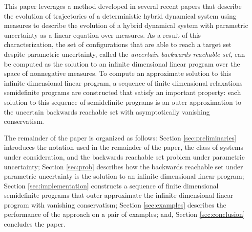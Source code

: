This paper leverages a method developed in several recent papers \cite{henrion2014convex,majumdar2014convex,shia2014convex} that describe the evolution of trajectories of a deterministic hybrid dynamical system using measures to describe the evolution of a hybrid dynamical system with parametric uncertainty as a linear equation over measures. 
As a result of this characterization, the set of configurations that are able to reach a target set despite parametric uncertainty, called the \emph{uncertain backwards reachable set}, can be computed as the solution to an infinite dimensional linear program over the space of nonnegative measures. 
To compute an approximate solution to this infinite dimensional linear program, a sequence of finite dimensional relaxations semidefinite programs are constructed that satisfy an important property:
each solution to this sequence of semidefinite programs is an outer approximation to the uncertain backwards reachable set with asymptotically vanishing conservatism.

The remainder of the paper is organized as follows: 
Section \ref{sec:preliminaries} introduces the notation used in the remainder of the paper, the class of systems under consideration, and the backwards reachable set problem under parametric uncertainty; 
Section \ref{sec:prob} describes how the backwards reachable set under parametric uncertainty is the solution to an infinite dimensional linear program; 
Section \ref{sec:implementation} constructs a sequence of finite dimensional semidefinite programs that outer approximate the infinite dimensional linear program with vanishing conservatism; 
Section \ref{sec:examples} describes the performance of the approach on a pair of examples; 
and, Section \ref{sec:conclusion} concludes the paper. 